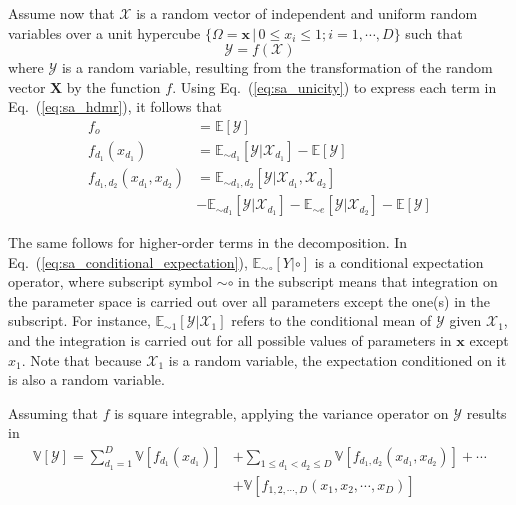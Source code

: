 Assume now that $\bm{\mathcal{X}}$ is a random vector of independent and uniform random variables over a unit hypercube
$\{\Omega = \mathbf{x} \, | \, 0 \leq x_i  \leq 1; i = 1,\cdots, D\}$ such that
\begin{equation}
	\mathcal{Y} = f(\bm{\mathcal{X}})
\label{eq:sa_random_function}
\end{equation}
where $\mathcal{Y}$ is a random variable, resulting from the transformation of the random vector $\mathbf{X}$ by the function $f$.
Using Eq.~(\ref{eq:sa_unicity}) to express each term in Eq.~(\ref{eq:sa_hdmr}), it follows that
\begin{equation}
	\begin{split}
		f_o & = \mathbb{E}[\mathcal{Y}] \\
	  f_{d_1}(x_{d_1}) & = \mathbb{E}_{\sim d_1}[\mathcal{Y}|\mathcal{X}_{d_1}] - \mathbb{E}[\mathcal{Y}]\\
    f_{d_1,d_2}(x_{d_1},x_{d_2}) & = \mathbb{E}_{\sim d_1,d_2} [\mathcal{Y}|\mathcal{X}_{d_1}, \mathcal{X}_{d_2}] \\
																 & - \mathbb{E}_{\sim d_1}[\mathcal{Y}|\mathcal{X}_{d_1}] - \mathbb{E}_{\sim e}[\mathcal{Y}|\mathcal{X}_{d_2}] - \mathbb{E}[\mathcal{Y}] 
	\end{split}
\label{eq:sa_conditional_expectation}
\end{equation}

The same follows for higher-order terms in the decomposition. 
In Eq.~(\ref{eq:sa_conditional_expectation}),
$\mathbb{E}_{\sim \circ} [Y|\circ]$ is a conditional expectation operator,
where subscript symbol $\sim\circ$ in the subscript means that integration on the parameter space is carried out over all parameters except the one(s) in the subscript.
For instance, $\mathbb{E}_{\sim 1} [\mathcal{Y}|\mathcal{X}_1]$ refers to the conditional mean of $\mathcal{Y}$ given $\mathcal{X}_1$, and the integration is carried out for all possible values of parameters in $\mathbf{x}$ except $x_1$.
Note that because $\mathcal{X}_1$ is a random variable, the expectation conditioned on it is also a random variable.

Assuming that $f$ is square integrable, applying the variance operator on $\mathcal{Y}$ results in
\begin{equation}
	\begin{split}
		\mathbb{V}[\mathcal{Y}] = \sum_{d_1=1}^{D} \mathbb{V}[f_{d_1} (x_{d_1})] & + \sum_{1 \leq d_1 < d_2 \leq D} \mathbb{V} [f_{d_1,d_2} (x_d_1, x_d_2)] + \cdots \\
	                                                       & + \mathbb{V} [f_{1,2,\cdots,D} (x_1, x_2, \cdots, x_D)]
		\end{split}
\label{eq:sa_variance_decomposition}
\end{equation}

